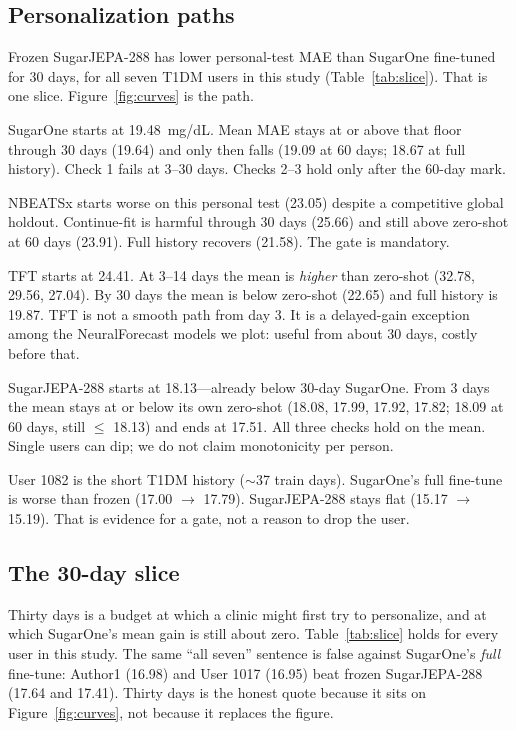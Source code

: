 \documentclass[11pt,a4paper]{article}
\begin{document}
\subsection{Personalization paths}
\label{sec:paths}

Frozen SugarJEPA-288 has lower personal-test MAE than SugarOne fine-tuned
for 30 days, for all seven T1DM users in this study
(Table~\ref{tab:slice}). That is one slice. Figure~\ref{fig:curves} is the
path.

SugarOne starts at 19.48~mg/dL. Mean MAE stays at or above that floor through
30 days (19.64) and only then falls (19.09 at 60 days; 18.67 at full
history). Check 1 fails at 3--30 days. Checks 2--3 hold only after the
60-day mark.

NBEATSx starts worse on this personal test (23.05) despite a competitive
global holdout. Continue-fit is harmful through 30 days (25.66) and still
above zero-shot at 60 days (23.91). Full history recovers (21.58). The gate
is mandatory.

TFT starts at 24.41. At 3--14 days the mean is \emph{higher} than zero-shot
(32.78, 29.56, 27.04). By 30 days the mean is below zero-shot (22.65) and
full history is 19.87. TFT is not a smooth path from day 3. It is a
delayed-gain exception among the NeuralForecast models we plot: useful from
about 30 days, costly before that.

SugarJEPA-288 starts at 18.13---already below 30-day SugarOne. From 3 days
the mean stays at or below its own zero-shot (18.08, 17.99, 17.92, 17.82;
18.09 at 60 days, still \(\le\) 18.13) and ends at 17.51. All three checks
hold on the mean. Single users can dip; we do not claim monotonicity per
person.

User 1082 is the short T1DM history (\(\sim\)37 train days). SugarOne's full
fine-tune is worse than frozen (17.00 \(\rightarrow\) 17.79). SugarJEPA-288
stays flat (15.17 \(\rightarrow\) 15.19). That is evidence for a gate, not a
reason to drop the user.

\subsection{The 30-day slice}
\label{sec:slice}

Thirty days is a budget at which a clinic might first try to personalize, and
at which SugarOne's mean gain is still about zero. Table~\ref{tab:slice}
holds for every user in this study. The same ``all seven'' sentence is false
against SugarOne's \emph{full} fine-tune: Author1 (16.98) and User 1017 (16.95)
beat frozen SugarJEPA-288 (17.64 and 17.41). Thirty days is the honest quote
because it sits on Figure~\ref{fig:curves}, not because it replaces the
figure.
\end{document}
